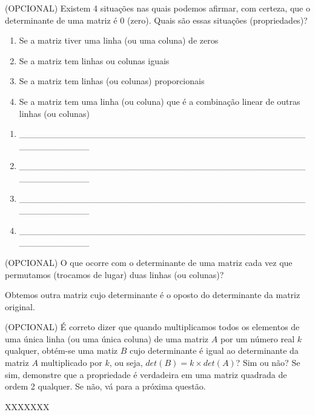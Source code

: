 \documentclass[pdftex, brazil, 12pt, oneside, addpoints]{exam}
\begin{document}
\begin{questions}
\question
(OPCIONAL) Existem 4 situações nas quais podemos afirmar, com certeza, que o
determinante de uma matriz é 0 (zero). Quais são essas situações
(propriedades)?
\ifprintanswers
\begin{solution}
  \vspace{-0.7cm}
\begin{enumerate}
  \item Se a matriz tiver uma linha (ou uma coluna) de zeros
  \item Se a matriz tem linhas ou colunas iguais
  \item Se a matriz tem linhas (ou colunas) proporcionais
  \item Se a matriz tem uma linha (ou coluna) que é a combinação
    linear de outras linhas (ou colunas)
\end{enumerate}
\end{solution}
\else
\begin{enumerate}
  \item \_\_\_\_\_\_\_\_\_\_\_\_\_\_\_\_\_\_\_\_\_\_\_\_\_\_\_\_\_\_\_\_\_\_\_\_\_\_\_\_\_\_\_\_\_\_\_\_\_\_\_\_\_\_\_\_
  \item \_\_\_\_\_\_\_\_\_\_\_\_\_\_\_\_\_\_\_\_\_\_\_\_\_\_\_\_\_\_\_\_\_\_\_\_\_\_\_\_\_\_\_\_\_\_\_\_\_\_\_\_\_\_\_\_
  \item \_\_\_\_\_\_\_\_\_\_\_\_\_\_\_\_\_\_\_\_\_\_\_\_\_\_\_\_\_\_\_\_\_\_\_\_\_\_\_\_\_\_\_\_\_\_\_\_\_\_\_\_\_\_\_\_
  \item \_\_\_\_\_\_\_\_\_\_\_\_\_\_\_\_\_\_\_\_\_\_\_\_\_\_\_\_\_\_\_\_\_\_\_\_\_\_\_\_\_\_\_\_\_\_\_\_\_\_\_\_\_\_\_\_
\end{enumerate}
\fi

\question
(OPCIONAL) O que ocorre com o determinante de uma matriz cada vez que permutamos
(trocamos de lugar) duas linhas (ou colunas)?
\begin{solutionorlines}
  Obtemos outra matriz cujo determinante é o oposto do determinante da
  matriz original.
\end{solutionorlines}

\question
(OPCIONAL) É correto dizer que quando multiplicamos todos os elementos de uma
única linha (ou uma única coluna) de uma matriz $A$ por um número real $k$
qualquer, obtém-se uma matiz $B$ cujo determinante é igual ao
determinante da matriz $A$ multiplicado por $k$, ou seja, $det(B) = k
\times det(A)$? Sim ou não? Se sim, demonstre que a propriedade é
verdadeira em uma matriz quadrada de ordem 2 qualquer. Se não, vá para
a próxima questão.
\begin{solution}
  XXXXXXX
\end{solution}


\end{questions}
\end{document}
